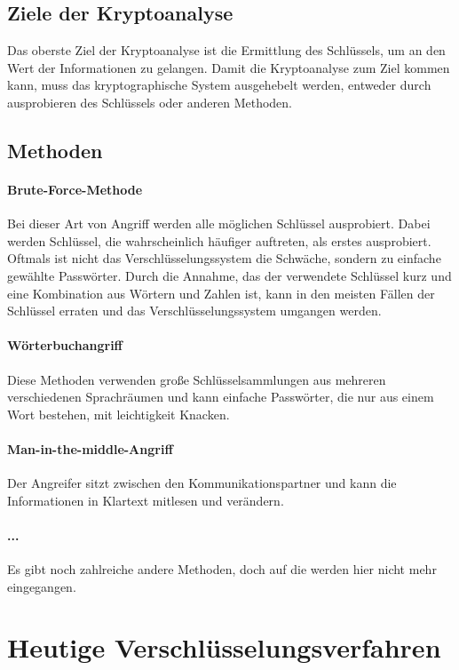 \documentclass[11pt,a4paper]{report}
\begin{document}
\subsection{Ziele der Kryptoanalyse}

Das oberste Ziel der Kryptoanalyse ist die Ermittlung des Schlüssels, um an den Wert der Informationen zu gelangen. Damit die Kryptoanalyse zum Ziel kommen kann, muss das kryptographische System ausgehebelt werden, entweder durch ausprobieren des Schlüssels oder anderen Methoden.

\subsection{Methoden}

\paragraph{Brute-Force-Methode} Bei dieser Art von Angriff werden alle möglichen Schlüssel ausprobiert. Dabei werden Schlüssel, die wahrscheinlich häufiger auftreten, als erstes ausprobiert. Oftmals ist nicht das Verschlüsselungssystem die Schwäche, sondern zu einfache gewählte Passwörter. Durch die Annahme, das der verwendete Schlüssel kurz und eine Kombination aus Wörtern und Zahlen ist, kann in den meisten Fällen der Schlüssel erraten und das Verschlüsselungssystem umgangen werden.

\paragraph{Wörterbuchangriff} Diese Methoden verwenden große Schlüsselsammlungen aus mehreren verschiedenen Sprachräumen und kann einfache Passwörter, die nur aus einem Wort bestehen, mit leichtigkeit Knacken.

\paragraph{Man-in-the-middle-Angriff} Der Angreifer sitzt zwischen den Kommunikationspartner und kann die Informationen in Klartext mitlesen und verändern.

\paragraph{...} Es gibt noch zahlreiche andere Methoden, doch auf die werden hier nicht mehr eingegangen. 

\section{Heutige Verschlüsselungsverfahren}
\end{document}
